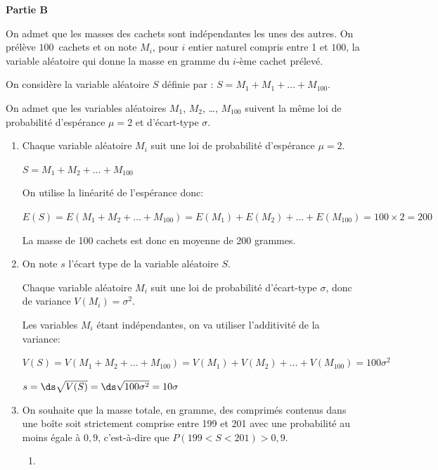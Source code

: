 \begin{center}
	\textbf{Partie B}
\end{center}

On admet que les masses des cachets sont indépendantes les unes des autres. On prélève 
$100$~cachets et on note $M_i$, pour $i$ entier naturel compris entre 1 et $100$, la variable aléatoire qui donne la masse en gramme du $i$-ème cachet prélevé.


On considère la variable aléatoire $S$ définie par :
$ S= M_1+ M_1+ \ldots+ M_{100}.$

On admet que les variables aléatoires $M_1$,\: $M_2$,\: \ldots,\: $M_{100}$ suivent la même loi de probabilité d'espérance $\mu = 2$ et d'écart-type $\sigma$.

\begin{enumerate}
	\item Chaque variable aléatoire $M_i$ suit une loi de probabilité d'espérance $\mu=2$.
	
$ S= M_1+ M_2+ \ldots+ M_{100}$

On utilise la linéarité de l'espérance donc:

$E(S) = E \left (M_1+ M_2+ \ldots+ M_{100} \right )
= E \left (M_1\right ) + E\left (M_2\right) + \ldots+ E\left (M_{100} \right)
= 100 \times 2 = 200$
	

La masse de 100 cachets est donc en moyenne de 200 grammes.

	\item On note $s$ l'écart type de la variable aléatoire $S$.
	
Chaque variable aléatoire $M_i$ suit une loi de probabilité d'écart-type $\sigma$, donc de variance $V\left (M_i\right ) = \sigma^2$.
	
Les variables $M_i$ étant indépendantes, on va utiliser l'additivité de la variance:

$V(S) = V \left (M_1+ M_2+ \ldots+ M_{100} \right )
= V \left (M_1\right ) + V\left (M_2\right )+ \ldots+ V\left (M_{100} \right )
= 100 \sigma^2$

$s = \ds\sqrt{V(S)} = \ds\sqrt{100 \sigma^2}=10\sigma$

	\item On souhaite que la masse totale, en gramme, des comprimés contenus dans une boîte soit strictement comprise entre 199 et 201 avec une probabilité au moins égale à $0,9$, c'est-à-dire que $P(199<S<201) > 0,9$.
	\begin{enumerate}
		\item %


\end{enumerate}
\end{enumerate}
